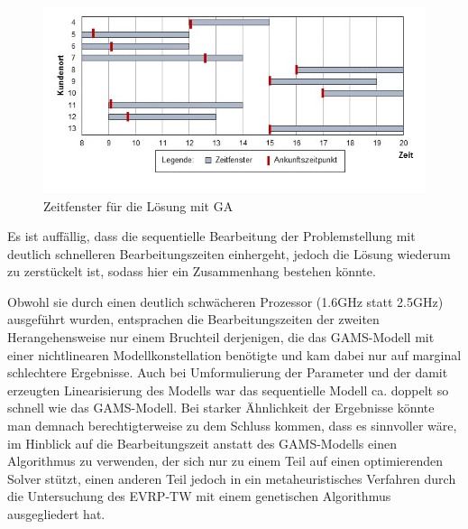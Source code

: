 \documentclass[a4paper,12pt,parskip,bibtotoc,liststotoc]{article}
\begin{document}
\begin{figure}[h!]
  \begin{center}
    \includegraphics[width=150mm]{zf1.jpg}
    \caption{Zeitfenster für die Lösung mit GA}  \label{Typen}
  \end{center}
\end{figure}


Es ist auffällig, dass die sequentielle Bearbeitung der Problemstellung mit deutlich schnelleren Bearbeitungszeiten einhergeht, jedoch die Lösung wiederum zu zerstückelt ist, sodass hier ein Zusammenhang bestehen könnte.

Obwohl sie durch einen deutlich schwächeren Prozessor (1.6GHz statt 2.5GHz) ausgeführt wurden, entsprachen die Bearbeitungszeiten der zweiten Herangehensweise nur einem Bruchteil derjenigen, die das GAMS-Modell mit einer nichtlinearen Modellkonstellation benötigte und kam dabei nur auf marginal schlechtere Ergebnisse.
Auch bei Umformulierung der Parameter und der damit erzeugten Linearisierung des Modells war das sequentielle Modell ca. doppelt so schnell wie das GAMS-Modell.
Bei starker Ähnlichkeit der Ergebnisse könnte man demnach berechtigterweise zu dem Schluss kommen, dass es sinnvoller wäre, im Hinblick auf die Bearbeitungszeit anstatt des GAMS-Modells einen Algorithmus zu verwenden, der sich nur zu einem Teil auf einen optimierenden Solver stützt, einen anderen Teil jedoch in ein metaheuristisches Verfahren durch die Untersuchung des EVRP-TW mit einem genetischen Algorithmus ausgegliedert hat.\\
\end{document}
